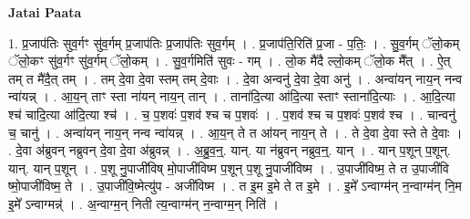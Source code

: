 \documentclass[17pt]{extarticle}
\begin{document}
\textbf{Jatai Paata} \newline

1. प्र॒जाप॑तिः सुव॒र्गꣳ सु॑व॒र्गम् प्र॒जाप॑तिः प्र॒जाप॑तिः सुव॒र्गम् । . प्र॒जाप॑ति॒रिति॑ प्र॒जा - प॒तिः॒ । . सु॒व॒र्गम् ॅलो॒कम् ॅलो॒कꣳ सु॑व॒र्गꣳ सु॑व॒र्गम् ॅलो॒कम् । . सु॒व॒र्गमिति॑ सुवः - गम् । . लो॒क मै॑दै ल्लो॒कम् ॅलो॒क मै᳚त् । . ऐ॒त् तम् त मै॑दै॒त् तम् । . तम् दे॒वा दे॒वा स्तम् तम् दे॒वाः । . दे॒वा अन्वनु॑ दे॒वा दे॒वा अनु॑ । . अन्वा॑यन् नाय॒न् नन्व न्वा॑यन्न् । . आ॒य॒न् ताꣳ स्ता ना॑यन् नाय॒न् तान् । . ताना॑दि॒त्या आ॑दि॒त्या स्ताꣳ स्ताना॑दि॒त्याः । . आ॒दि॒त्या श्च॑ चादि॒त्या आ॑दि॒त्या श्च॑ । . च॒ प॒शवः॑ प॒शव॑ श्च च प॒शवः॑ । . प॒शव॑ श्च च प॒शवः॑ प॒शव॑ श्च । . चान्वनु॑ च॒ चानु॑ । . अन्वा॑यन् नाय॒न् नन्व न्वा॑यन्न् । . आ॒य॒न् ते त आ॑यन् नाय॒न् ते । . ते दे॒वा दे॒वा स्ते ते दे॒वाः । . दे॒वा अ॑ब्रुवन् नब्रुवन् दे॒वा दे॒वा अ॑ब्रुवन्न् । . अ॒ब्रु॒व॒न्॒. यान्. या न॑ब्रुवन् नब्रुव॒न्॒. यान् । . यान् प॒शून् प॒शून्. यान्. यान् प॒शून् । . प॒शू नु॒पाजी॑विष् मो॒पाजी॑विष्म प॒शून् प॒शू नु॒पाजी॑विष्म । . उ॒पाजी॑विष्म॒ ते त उ॒पाजी॑वि ष्मो॒पाजी॑विष्म॒ ते । . उ॒पाजी॑वि॒ष्मेत्यु॑प - अजी॑विष्म । . त इ॒म इ॒मे ते त इ॒मे । . इ॒मे᳚ ऽन्वाग्म॑न् न॒न्वाग्म॑न् नि॒म इ॒मे᳚ ऽन्वाग्मन्न्॑ । . अ॒न्वाग्म॒न् निती त्य॒न्वाग्म॑न् न॒न्वाग्म॒न् निति॑ । \newline
\end{document}
